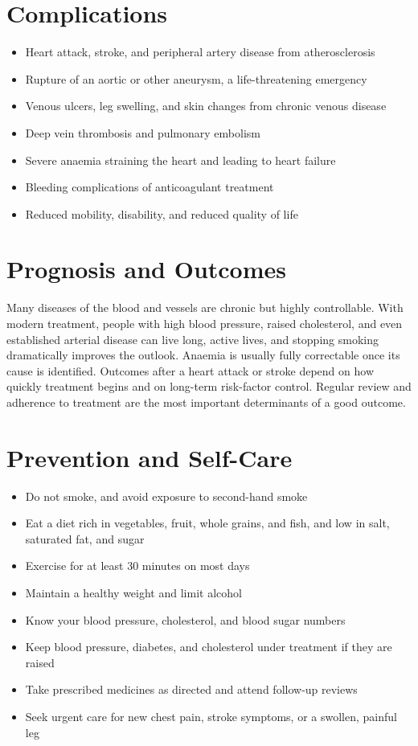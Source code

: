 \section*{Complications}
\begin{itemize}
    \item Heart attack, stroke, and peripheral artery disease from atherosclerosis
    \item Rupture of an aortic or other aneurysm, a life-threatening emergency
    \item Venous ulcers, leg swelling, and skin changes from chronic venous disease
    \item Deep vein thrombosis and pulmonary embolism
    \item Severe anaemia straining the heart and leading to heart failure
    \item Bleeding complications of anticoagulant treatment
    \item Reduced mobility, disability, and reduced quality of life
\end{itemize}

\section*{Prognosis and Outcomes}
Many diseases of the blood and vessels are chronic but highly controllable. With modern treatment, people with high blood pressure, raised cholesterol, and even established arterial disease can live long, active lives, and stopping smoking dramatically improves the outlook. Anaemia is usually fully correctable once its cause is identified. Outcomes after a heart attack or stroke depend on how quickly treatment begins and on long-term risk-factor control. Regular review and adherence to treatment are the most important determinants of a good outcome.

\section*{Prevention and Self-Care}
\begin{itemize}
    \item Do not smoke, and avoid exposure to second-hand smoke
    \item Eat a diet rich in vegetables, fruit, whole grains, and fish, and low in salt, saturated fat, and sugar
    \item Exercise for at least 30 minutes on most days
    \item Maintain a healthy weight and limit alcohol
    \item Know your blood pressure, cholesterol, and blood sugar numbers
    \item Keep blood pressure, diabetes, and cholesterol under treatment if they are raised
    \item Take prescribed medicines as directed and attend follow-up reviews
    \item Seek urgent care for new chest pain, stroke symptoms, or a swollen, painful leg
\end{itemize}

